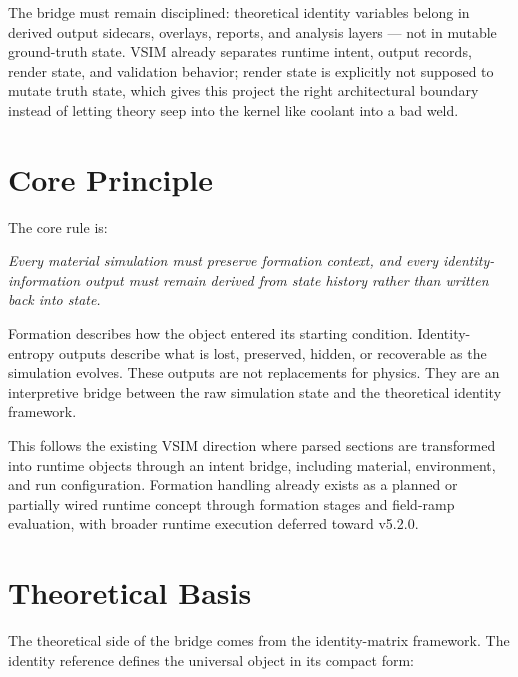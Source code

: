 \documentclass[11pt,a4paper]{article}
\begin{document}
The bridge must remain disciplined: theoretical identity variables belong in derived output
sidecars, overlays, reports, and analysis layers --- not in mutable ground-truth state. VSIM
already separates runtime intent, output records, render state, and validation behavior; render
state is explicitly not supposed to mutate truth state, which gives this project the right
architectural boundary instead of letting theory seep into the kernel like coolant into a bad weld.

\section{Core Principle}

The core rule is:

\begin{principlebox}
\itshape
Every material simulation must preserve formation context, and every identity-information
output must remain derived from state history rather than written back into state.
\end{principlebox}

Formation describes how the object entered its starting condition. Identity-entropy outputs
describe what is lost, preserved, hidden, or recoverable as the simulation evolves. These
outputs are not replacements for physics. They are an interpretive bridge between the raw
simulation state and the theoretical identity framework.

This follows the existing VSIM direction where parsed sections are transformed into runtime
objects through an intent bridge, including material, environment, and run configuration.
Formation handling already exists as a planned or partially wired runtime concept through
formation stages and field-ramp evaluation, with broader runtime execution deferred toward v5.2.0.

\section{Theoretical Basis}

The theoretical side of the bridge comes from the identity-matrix framework.
The identity reference defines the universal object in its compact form:
\end{document}
